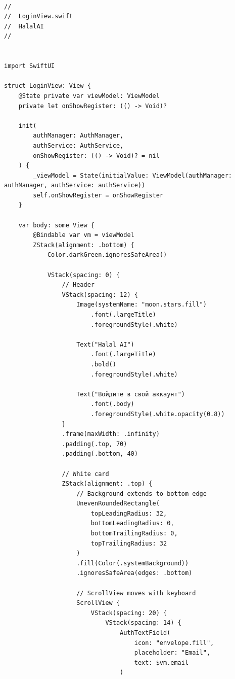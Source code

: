 \begin{lstlisting}[basicstyle=\tiny\ttfamily,breaklines=true]

//
//  LoginView.swift
//  HalalAI
//


import SwiftUI

struct LoginView: View {
    @State private var viewModel: ViewModel
    private let onShowRegister: (() -> Void)?

    init(
        authManager: AuthManager,
        authService: AuthService,
        onShowRegister: (() -> Void)? = nil
    ) {
        _viewModel = State(initialValue: ViewModel(authManager: authManager, authService: authService))
        self.onShowRegister = onShowRegister
    }

    var body: some View {
        @Bindable var vm = viewModel
        ZStack(alignment: .bottom) {
            Color.darkGreen.ignoresSafeArea()

            VStack(spacing: 0) {
                // Header
                VStack(spacing: 12) {
                    Image(systemName: "moon.stars.fill")
                        .font(.largeTitle)
                        .foregroundStyle(.white)

                    Text("Halal AI")
                        .font(.largeTitle)
                        .bold()
                        .foregroundStyle(.white)

                    Text("Войдите в свой аккаунт")
                        .font(.body)
                        .foregroundStyle(.white.opacity(0.8))
                }
                .frame(maxWidth: .infinity)
                .padding(.top, 70)
                .padding(.bottom, 40)

                // White card
                ZStack(alignment: .top) {
                    // Background extends to bottom edge
                    UnevenRoundedRectangle(
                        topLeadingRadius: 32,
                        bottomLeadingRadius: 0,
                        bottomTrailingRadius: 0,
                        topTrailingRadius: 32
                    )
                    .fill(Color(.systemBackground))
                    .ignoresSafeArea(edges: .bottom)

                    // ScrollView moves with keyboard
                    ScrollView {
                        VStack(spacing: 20) {
                            VStack(spacing: 14) {
                                AuthTextField(
                                    icon: "envelope.fill",
                                    placeholder: "Email",
                                    text: $vm.email
                                )


\end{lstlisting}
